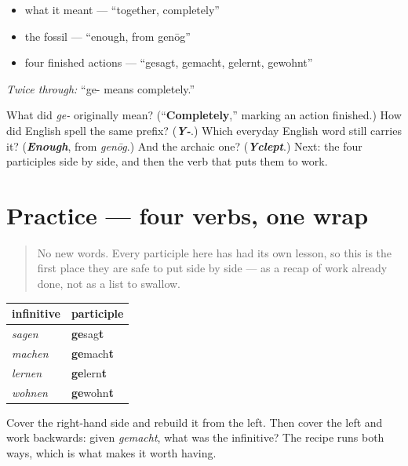 \begin{itemize}
\raggedright
  \item what it meant — \textquotedblleft{}together, completely\textquotedblright{}
  \item the fossil — \textquotedblleft{}enough, from genōg\textquotedblright{}
  \item four finished actions — \textquotedblleft{}gesagt, gemacht, gelernt, gewohnt\textquotedblright{}
\end{itemize}

\emph{Twice through:} \textquotedblleft{}ge- means completely.\textquotedblright{}

\begin{tcolorbox}[breakable,colback=teal!4,colframe=teal!35!black,title={Before you move on}]
What did \emph{ge-} originally mean? (\textquotedblleft{}\textbf{Completely},\textquotedblright{} marking an action finished.) How did English spell the same prefix? (\emph{\textbf{Y-}}.) Which everyday English word still carries it? (\emph{\textbf{Enough}}, from \emph{genōg}.) And the archaic one? (\emph{\textbf{Yclept}}.) Next: the four participles side by side, and then the verb that puts them to work.
\end{tcolorbox}
\section[Practice]{Practice — four verbs, one wrap}

\label{lesson:GE-C15-partizip-practice}



\begin{quote}
No new words. Every participle here has had its own lesson, so this is the first place they are safe to put side by side — as a recap of work already done, not as a list to swallow.
\end{quote}

\begin{grammarlens}[title={Grammar Lens: the four, assembled}]
\noindent
\begin{tabularx}{\linewidth}{@{}>{\raggedright\arraybackslash}X>{\raggedright\arraybackslash}X@{}}
\toprule
\textbf{infinitive} & \textbf{participle} \\
\midrule
\emph{sagen} & \textbf{ge}sag\textbf{t} \\
\emph{machen} & \textbf{ge}mach\textbf{t} \\
\emph{lernen} & \textbf{ge}lern\textbf{t} \\
\emph{wohnen} & \textbf{ge}wohn\textbf{t} \\
\bottomrule
\end{tabularx}

Cover the right-hand side and rebuild it from the left. Then cover the left and work backwards: given \emph{gemacht}, what was the infinitive? The recipe runs both ways, which is what makes it worth having.
\end{grammarlens}

